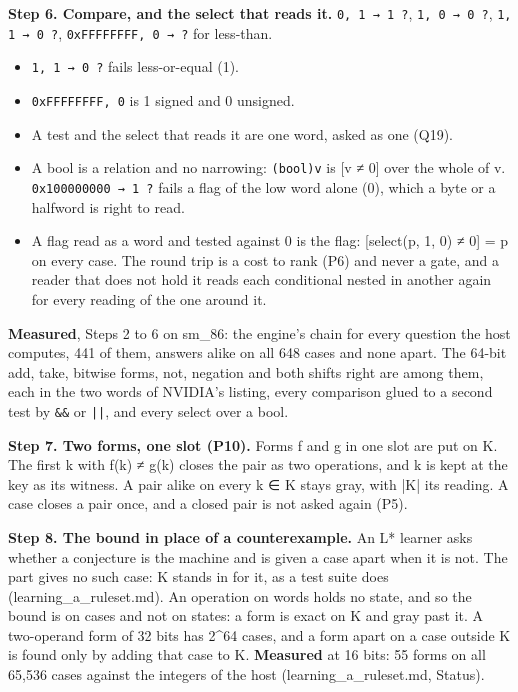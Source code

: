\textbf{Step 6. Compare, and the select that reads it.} \texttt{0, 1 → 1 ?}, \texttt{1, 0 → 0 ?}, \texttt{1, 1 → 0 ?}, \texttt{0x\allowbreak{}FFFFFFFF, 0 → ?} for less-than.

\begin{itemize}
\item \texttt{1, 1 → 0 ?} fails less-or-equal (1).
\item \texttt{0x\allowbreak{}FFFFFFFF, 0} is 1 signed and 0 unsigned.
\item A test and the select that reads it are one word, asked as one (Q19).
\item A bool is a relation and no narrowing: \texttt{(bool)v} is [v ≠ 0] over the whole of v. \texttt{0x100000000 → 1 ?} fails a flag of the low word alone (0), which a byte or a halfword is right to read.
\item A flag read as a word and tested against 0 is the flag: [select(p, 1, 0) ≠ 0] = p on every case. The round trip is a cost to rank (P6) and never a gate, and a reader that does not hold it reads each conditional nested in another again for every reading of the one around it.
\end{itemize}

\textbf{Measured}, Steps 2 to 6 on sm\_\allowbreak{}86: the engine's chain for every question the host computes, 441 of them, answers alike on all 648 cases and none apart. The 64-bit add, take, bitwise forms, not, negation and both shifts right are among them, each in the two words of NVIDIA's listing, every comparison glued to a second test by \texttt{\&\&} or \texttt{||}, and every select over a bool.

\textbf{Step 7. Two forms, one slot (P10).} Forms f and g in one slot are put on K. The first k with f(k) ≠ g(k) closes the pair as two operations, and k is kept at the key as its witness. A pair alike on every k ∈ K stays gray, with |K| its reading. A case closes a pair once, and a closed pair is not asked again (P5).

\textbf{Step 8. The bound in place of a counterexample.} An L* learner asks whether a conjecture is the machine and is given a case apart when it is not. The part gives no such case: K stands in for it, as a test suite does (learning\_\allowbreak{}a\_\allowbreak{}ruleset.md). An operation on words holds no state, and so the bound is on cases and not on states: a form is exact on K and gray past it. A two-operand form of 32 bits has 2\textasciicircum{}64 cases, and a form apart on a case outside K is found only by adding that case to K. \textbf{Measured} at 16 bits: 55 forms on all 65,536 cases against the integers of the host (learning\_\allowbreak{}a\_\allowbreak{}ruleset.md, Status).

